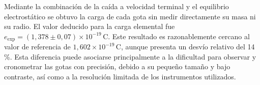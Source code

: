 \documentclass{article}
\begin{document}
Mediante la combinación de la caída a velocidad terminal y el equilibrio electrostático se obtuvo la carga de cada gota sin medir directamente su masa ni su radio. El valor deducido para la carga elemental fue $e_{\mathrm{exp}}=(1{,}378\pm0{,}07)\times10^{-19}\,\mathrm{C}$. Este resultado es razonablemente cercano al valor de referencia de $1{,}602\times10^{-19}\,\mathrm{C}$, aunque presenta un desvío relativo del 14 \%. Esta diferencia puede asociarse principalmente a la dificultad para observar y cronometrar las gotas con precisión, debido a su pequeño tamaño y bajo contraste, así como a la resolución limitada de los instrumentos utilizados.
\end{document}
